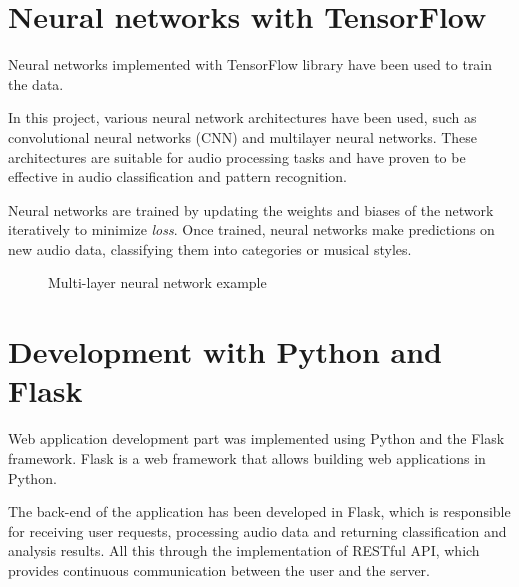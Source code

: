 \section{Neural networks with TensorFlow}

Neural networks implemented with TensorFlow library have been used to train the data.

In this project, various neural network architectures have been used, such as convolutional neural networks (CNN) and multilayer neural networks. These architectures are suitable for audio processing tasks and have proven to be effective in audio classification and pattern recognition.

Neural networks are trained by updating the weights and biases of the network iteratively to minimize \textit{loss}. Once trained, neural networks make predictions on new audio data, classifying them into categories or musical styles.

\begin{figure}
  \centering
  \caption{Multi-layer neural network example}
\end{figure}

\section{Development with Python and Flask}

Web application development part was implemented using Python and the Flask framework. Flask is a web framework that allows building web applications in Python.

The back-end of the application has been developed in Flask, which is responsible for receiving user requests, processing audio data and returning classification and analysis results. 
All this through the implementation of RESTful API, which provides continuous communication between the user and the server.

